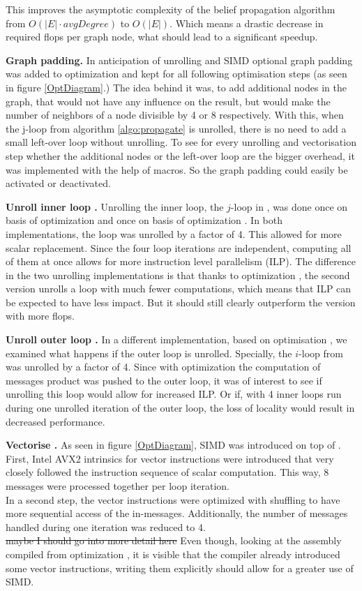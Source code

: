 \documentclass[letterpaper]{article}
\let\cref=\Cref %
\newcommand{\mypar}[1]{{\bf #1.}}
\begin{document}
This improves the asymptotic complexity of the belief propagation algorithm from $O(|E|\cdot avgDegree)$ to $O(|E|)$. Which means a drastic decrease in required flops per graph node, what should lead to a significant speedup.

\mypar{Graph padding}
In anticipation of unrolling and SIMD optional graph padding was added to optimization  and kept for all following optimisation steps (as seen in figure \ref{OptDiagram}.) The idea behind it was, to add additional nodes in the graph, that would not have any influence on the result, but would make the number of neighbors of a node divisible by 4 or 8 respectively. With this, when the j-loop from algorithm \ref{algo:propagate} is unrolled, there is no need to add a small left-over loop without unrolling. To see for every unrolling and vectorisation step whether the additional nodes or the left-over loop are the bigger overhead, it was implemented with the help of macros. So the graph padding could easily be activated or deactivated.


\mypar{Unroll inner loop }
Unrolling the inner loop, the $j$-loop in \cref{algo:propagate}, was done once on basis of optimization  and once on basis of optimization . In both implementations, the loop was unrolled by a factor of 4. This allowed for more scalar replacement. Since the four loop iterations are independent, computing all of them at once allows for more instruction level parallelism (ILP).
The difference in the two unrolling implementations is that thanks to optimization , the second version unrolls a loop with much fewer computations, which means that ILP can be expected to have less impact. But it should still clearly outperform the version with more flops.


\mypar{Unroll outer loop }
In a different implementation, based on optimisation , we examined what happens if the outer loop is unrolled. Specially, the $i$-loop from \cref{algo:propagate} was unrolled by a factor of 4. Since with optimization  the computation of messages product was pushed to the outer loop, it was of interest to see if unrolling this loop would allow for increased ILP. Or if, with 4 inner loops run during one unrolled iteration of the outer loop, the loss of locality would result in decreased performance.

\mypar{Vectorise }
As seen in figure \ref{OptDiagram}, SIMD was introduced on top of . First, Intel AVX2 intrinsics for vector instructions were introduced that very closely followed the instruction sequence of scalar computation. This way, 8 messages were processed together per loop iteration.\\
In a second step, the vector instructions were optimized with shuffling to have more sequential access of the in-messages. Additionally, the number of messages handled during one iteration was reduced to 4.\\ \st{maybe I should go into more detail here}
Even though, looking at the assembly compiled from optimization , it is visible that the compiler already introduced some vector instructions, writing them explicitly should allow for a greater use of SIMD.
\end{document}
